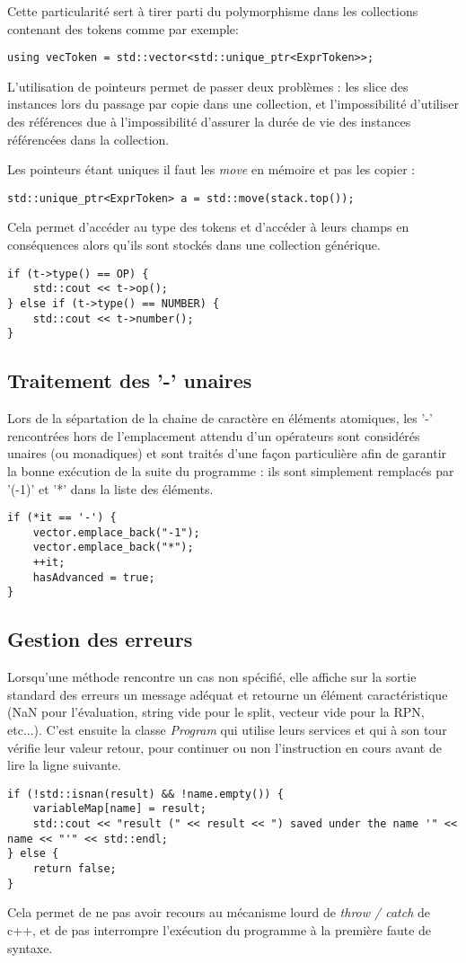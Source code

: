 \documentclass[]{article}
\begin{document}
Cette particularité sert à tirer parti du polymorphisme dans les collections contenant des tokens comme par exemple:

\begin{lstlisting}	
using vecToken = std::vector<std::unique_ptr<ExprToken>>;
\end{lstlisting}

L'utilisation de pointeurs permet de passer deux problèmes : les slice des instances lors du passage par copie dans une collection, et l'impossibilité d'utiliser des références due à l'impossibilité d'assurer la durée de vie des instances référencées dans la collection.

Les pointeurs étant uniques il faut les \textit{move} en mémoire et pas les copier :
\begin{lstlisting}
std::unique_ptr<ExprToken> a = std::move(stack.top()); 
\end{lstlisting}

Cela permet d'accéder au type des tokens et d'accéder à leurs champs en conséquences alors qu'ils sont stockés dans une collection générique.
\begin{lstlisting}
if (t->type() == OP) {
	std::cout << t->op();
} else if (t->type() == NUMBER) {
	std::cout << t->number();
}
\end{lstlisting}

\newpage
\subsection{Traitement des '-' unaires} 
Lors de la sépartation de la chaine de caractère en éléments atomiques, les '-' rencontrées hors de l'emplacement attendu d'un opérateurs sont considérés unaires (ou monadiques) et sont traités d'une façon particulière afin de garantir la bonne exécution de la suite du programme : ils sont simplement remplacés par '(-1)' et '*' dans la liste des éléments.
\begin{lstlisting}
if (*it == '-') {
	vector.emplace_back("-1");
	vector.emplace_back("*");
	++it;
	hasAdvanced = true;
}
\end{lstlisting} 

\subsection{Gestion des erreurs}
Lorsqu'une méthode rencontre un cas non spécifié, elle affiche sur la sortie standard des erreurs un message adéquat et retourne un élément caractéristique (NaN pour l'évaluation, string vide pour le split, vecteur vide pour la RPN, etc...). C'est ensuite la classe \textit{Program} qui utilise leurs services et qui à son tour vérifie leur valeur retour, pour continuer ou non l'instruction en cours avant de lire la ligne suivante.
\begin{lstlisting}
if (!std::isnan(result) && !name.empty()) {
	variableMap[name] = result;
	std::cout << "result (" << result << ") saved under the name '" << name << "'" << std::endl;
} else {
	return false;
}
\end{lstlisting} 
Cela permet de ne pas avoir recours au mécanisme lourd de \textit{throw / catch} de c++, et de pas interrompre l'exécution du programme à la première faute de syntaxe.
\end{document}
